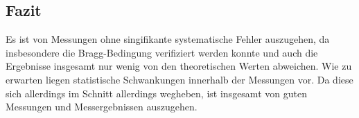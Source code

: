 \subsection{Fazit}%
Es ist von Messungen ohne singifikante systematische Fehler auszugehen, da insbesondere die Bragg-Bedingung verifiziert werden konnte
und auch die Ergebnisse insgesamt nur wenig von den theoretischen Werten abweichen.
Wie zu erwarten liegen statistische Schwankungen innerhalb der Messungen vor.
Da diese sich allerdings im Schnitt allerdings wegheben, ist insgesamt von guten Messungen und Messergebnissen auszugehen.
